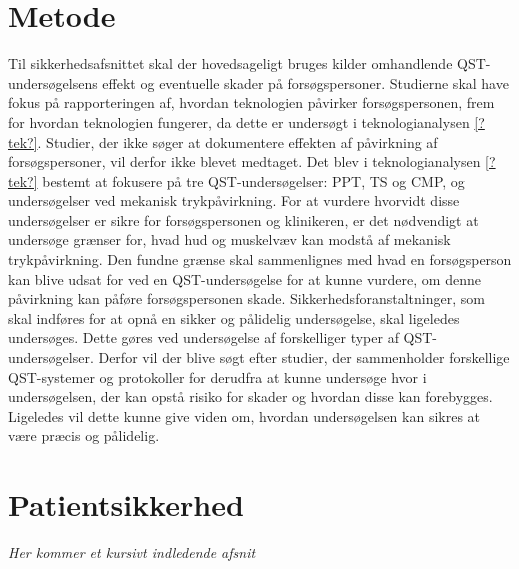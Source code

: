 \section{Metode \citep{HTAcore}}
Til sikkerhedsafsnittet skal der hovedsageligt bruges kilder omhandlende QST-undersøgelsens effekt og eventuelle skader på forsøgspersoner. Studierne skal have fokus på rapporteringen af, hvordan teknologien påvirker forsøgspersonen, frem for hvordan teknologien fungerer, da dette er undersøgt i teknologianalysen \ref{?tek?}. Studier, der ikke søger at dokumentere effekten af påvirkning af forsøgspersoner, vil derfor ikke blevet medtaget. Det blev i teknologianalysen \ref{?tek?} bestemt at fokusere på tre QST-undersøgelser: PPT, TS og CMP, og undersøgelser ved mekanisk trykpåvirkning. For at vurdere hvorvidt disse undersøgelser er sikre for forsøgspersonen og klinikeren, er det nødvendigt at undersøge grænser for, hvad hud og muskelvæv kan modstå af mekanisk trykpåvirkning. Den fundne grænse skal sammenlignes med hvad en forsøgsperson kan blive udsat for ved en QST-undersøgelse for at kunne vurdere, om denne påvirkning kan påføre forsøgspersonen skade. Sikkerhedsforanstaltninger, som skal indføres for at opnå en sikker og pålidelig undersøgelse, skal ligeledes undersøges. Dette gøres ved undersøgelse af forskelliger typer af QST-undersøgelser. Derfor vil der blive søgt efter studier, der sammenholder forskellige QST-systemer og protokoller for derudfra at kunne undersøge hvor i undersøgelsen, der kan opstå risiko for skader og hvordan disse kan forebygges. Ligeledes vil dette kunne give viden om, hvordan undersøgelsen kan sikres at være præcis og pålidelig.

\section{Patientsikkerhed}
\textit{Her kommer et kursivt indledende afsnit}
